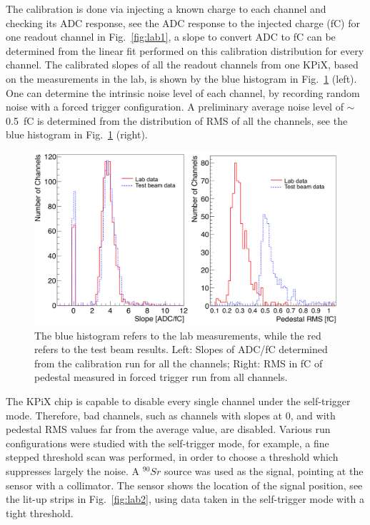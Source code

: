 \documentclass[journal]{IEEEtran}
\begin{document}
The calibration is done via injecting a known charge to each channel and checking its ADC response,
see the ADC response to the injected charge (fC) for one readout channel in Fig.~\ref{fig:lab1},
a slope to convert ADC to fC can be determined from the linear fit performed on this calibration distribution for every channel.
The calibrated slopes of all the readout channels from one KPiX, based on the measurements in the lab,
is shown by the blue histogram in Fig.~\ref{fig:labtb} (left).
One can determine the intrinsic noise level of each channel, by recording random noise with a forced trigger configuration.
A preliminary average noise level of $\sim$\SI{0.5}{fC} is determined from the distribution of RMS of all the channels, see the blue histogram in Fig.~\ref{fig:labtb} (right).

\begin{figure}[!ht]%
  \centering
  \includegraphics[width=1.0\linewidth]{pics/calib_duopic.png}
  \caption{
  The blue histogram refers to the lab measurements, while the red refers to the test beam results.
  Left: Slopes of ADC/fC determined from the calibration run for all the channels;
  Right: RMS in fC of pedestal measured in forced trigger run from all channels.}%
\label{fig:labtb}%
\end{figure}

The KPiX chip is capable to disable every single channel under the self-trigger mode.
Therefore, bad channels, such as channels with slopes at $0$, and with pedestal RMS values far from the average value, are disabled.
Various run configurations were studied with the self-trigger mode,
for example, a fine stepped threshold scan was performed, in order to choose a threshold which suppresses largely the noise.
A $^{90}Sr$ source was used as the signal, pointing at the sensor with a collimator.
The sensor shows the location of the signal position, see the lit-up strips in Fig.~\ref{fig:lab2},
using data taken in the self-trigger mode with a tight threshold.
\end{document}
